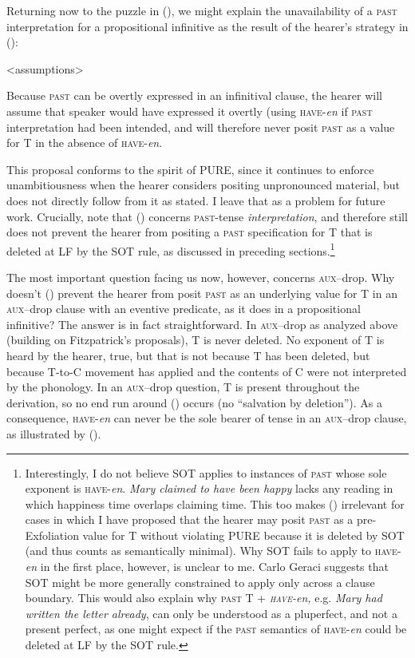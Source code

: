 \documentclass[output=paper]{langscibook}
\begin{document}
Returning now to the puzzle in \noindent (), we might explain the unavailability of a \textsc{past }interpretation for a propositional infinitive as the result of the hearer's strategy in ():

\pex<assumptions>

Because \textsc{past} can be overtly expressed in an infinitival clause, the hearer will assume that speaker would have expressed it overtly (using \textsc{have}-\textit{en} if \textsc{past} interpretation had been intended, and will therefore never posit \textsc{past} as a value for T in the absence of \textsc{have}-\textit{en}.
\xe

\noindent This proposal conforms to the spirit of PURE, since it continues to enforce unambitiousness when the hearer considers positing unpronounced material, but does not directly follow from it as stated. I leave that as a problem for future work. Crucially, note that \noindent () concerns \textsc{past}-tense \textit{interpretation}, and therefore still does not prevent the hearer from positing a \textsc{past }specification for T that is\textsc{ }deleted at LF by the SOT rule, as discussed in preceding sections.\footnote{Interestingly, I do not believe SOT applies to instances of \textsc{past }whose sole exponent is \textsc{have-}\textit{en}. \textit{Mary claimed to have been happy} lacks any reading in which happiness time overlaps claiming time. This too makes \noindent () irrelevant for cases in which I have proposed that the hearer may posit \textsc{past }as a pre-Exfoliation value for T without violating PURE because it is deleted by SOT (and thus counts as semantically minimal). Why SOT fails to apply to \textsc{have}-\textit{en} in the first place, however, is unclear to me. Carlo Geraci suggests that SOT might be more generally constrained to apply only across a clause boundary. This would also explain why \textsc{past }T + \textit{\textsc{have-}}\textit{en, }e.g. \textit{Mary had written the letter already}, can only be understood as a pluperfect, and not a present perfect, as one might expect if the \textsc{past} semantics of \textsc{have-}\textit{en}\textsc{ }could be deleted at LF by the SOT rule. } 

The most important question facing us now, however, concerns \textsc{aux}--drop. Why doesn't ()  prevent the hearer from posit \textsc{past }as an underlying value for T in an \textsc{aux}--drop clause with an eventive predicate, as it does in a propositional infinitive? The answer is in fact straightforward. In \textsc{aux}--drop as analyzed above (building on Fitzpatrick's proposals), T is never deleted. No exponent of T is heard by the hearer, true, but that is not because T has been deleted, but because T-to-C movement has applied and the contents of C were not interpreted by the phonology. In an \textsc{aux}--drop question, T is present throughout the derivation, so no end run around () occurs (no “salvation by deletion”). As a consequence, \textsc{have}-\textit{en }can never be the sole bearer of tense in an \textsc{aux}--drop clause, as illustrated by ().
\end{document}
